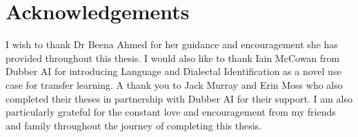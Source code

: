 \chapter*{Acknowledgements}\label{ack}
I wish to thank Dr Beena Ahmed for her guidance and encouragement she has 
provided throughout this thesis. I would also like to thank Iain McCowan from Dubber AI for introducing 
Language and Dialectal Identification as a novel use case for transfer learning. A thank you to Jack Murray and Erin Moss 
who also completed their theses in partnership with Dubber AI for their support. I am also particularly grateful for the constant love and encouragement 
from my friends and family throughout the journey of completing this thesis. 
